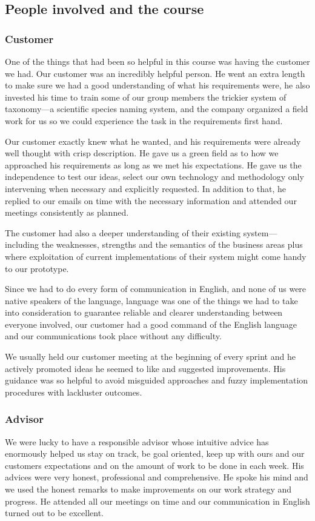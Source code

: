 \subsection{People involved and the course}
	\subsubsection{Customer}
One of the things that had been so helpful in this course was having the customer we had. Our customer was an incredibly helpful person. He went an extra length to make sure we had a good understanding of what his requirements were, he also invested his time to train some of our group members the trickier system of taxonomy---a scientific species naming system, and the company organized a field work for us so we could experience the task in the requirements first hand.

Our customer exactly knew what he wanted, and his requirements were already well thought with crisp description. He gave us a green field as to how we approached his requirements as long as we met his expectations. He gave us the independence to test our ideas, select our own technology and methodology only intervening when necessary and explicitly requested. In addition to that, he replied to our emails on time with the necessary information and attended our meetings consistently as planned.

The customer had also a deeper understanding of their existing system---including the weaknesses, strengths and the semantics of the business areas plus where exploitation of current implementations of their system might come handy to our prototype.

Since we had to do every form of communication in English, and none of us were native speakers of the language, language was one of the things we had to take into consideration to guarantee reliable and clearer understanding between everyone involved, our customer had a good command of the English language and our communications took place without any difficulty.

We usually held our customer meeting at the beginning of every sprint and he actively promoted ideas he seemed to like and suggested improvements.  His guidance was so helpful to avoid misguided approaches and fuzzy implementation procedures with lackluster outcomes.

	\subsubsection{Advisor}
We were lucky to have a responsible advisor whose intuitive advice has enormously helped us stay on track, be goal oriented, keep up with ours and our customers expectations and on the amount of work to be done in each week. His advices were very honest, professional and comprehensive. He spoke his mind and we used the honest remarks to make improvements on our work strategy and progress. He attended all our meetings on time and our communication in English turned out to be excellent.

